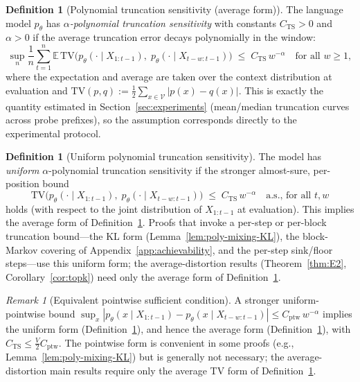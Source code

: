 \documentclass[11pt]{article}
\newcommand{\V}{\mathcal{V}}
\newcommand{\E}{\mathbb{E}}
\newcommand{\TV}{\mathrm{TV}}
\theoremstyle{plain}
\theoremstyle{definition}
\newtheorem{definition}[theorem]{Definition}
\theoremstyle{remark}
\newtheorem{remark}[theorem]{Remark}
\begin{document}
\begin{definition}[Polynomial truncation sensitivity (average form)]\label{def:poly-mixing}
The language model $p_\theta$ has \emph{$\alpha$-polynomial truncation
sensitivity} with constants $C_{\mathrm{TS}} > 0$ and $\alpha > 0$ if
the average truncation error decays polynomially in the window:
\[
\sup_n \frac1n\sum_{t=1}^n
\E\,\TV\bigl(p_\theta(\cdot \mid X_{1:t-1}),\; p_\theta(\cdot \mid X_{t-w:t-1})\bigr)
\;\leq\; C_{\mathrm{TS}}\,w^{-\alpha}
\quad\text{for all } w \geq 1,
\]
where the expectation and average are taken over the context
distribution at evaluation and
$\TV(p, q) := \frac{1}{2}\sum_{x \in \V} |p(x) - q(x)|$. This is exactly
the quantity estimated in Section~\ref{sec:experiments} (mean/median
truncation curves across probe prefixes), so the assumption corresponds
directly to the experimental protocol.
\end{definition}

\begin{definition}[Uniform polynomial truncation sensitivity]\label{def:poly-mixing-unif}
The model has \emph{uniform} $\alpha$-polynomial truncation sensitivity
if the stronger almost-sure, per-position bound
\[
\TV\bigl(p_\theta(\cdot \mid X_{1:t-1}),\; p_\theta(\cdot \mid X_{t-w:t-1})\bigr)
\;\leq\; C_{\mathrm{TS}}\,w^{-\alpha}
\quad\text{a.s., for all } t, w
\]
holds (with respect to the joint distribution of $X_{1:t-1}$ at
evaluation). This implies the average form of
Definition~\ref{def:poly-mixing}. Proofs that invoke a per-step or
per-block truncation bound---the KL form
(Lemma~\ref{lem:poly-mixing-KL}), the block-Markov covering of
Appendix~\ref{app:achievability}, and the per-step sink/floor
steps---use this uniform form; the average-distortion results
(Theorem~\ref{thm:E2}, Corollary~\ref{cor:topk}) need only the average
form of Definition~\ref{def:poly-mixing}.
\end{definition}

\begin{remark}[Equivalent pointwise sufficient condition]
\label{rmk:pointwise-sufficient}
A stronger uniform-pointwise bound
$\sup_x |p_\theta(x \mid X_{1:t-1}) - p_\theta(x \mid X_{t-w:t-1})|
\leq C_{\mathrm{ptw}}\,w^{-\alpha}$
implies the uniform form (Definition~\ref{def:poly-mixing-unif}), and
hence the average form (Definition~\ref{def:poly-mixing}), with
$C_{\mathrm{TS}} \leq \frac{V}{2} C_{\mathrm{ptw}}$. The pointwise
form is convenient in some proofs (e.g.,
Lemma~\ref{lem:poly-mixing-KL}) but is generally not necessary; the
average-distortion main results require only the average TV form of
Definition~\ref{def:poly-mixing}.
\end{remark}
\end{document}
